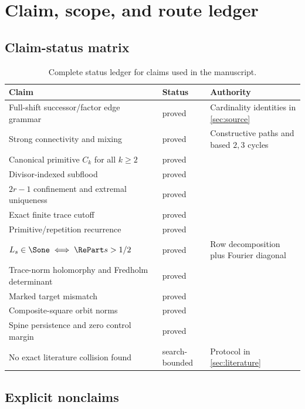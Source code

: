 \section{Claim, scope, and route ledger}
\label{app:ledger}

\subsection{Claim-status matrix}

\begin{table}[ht]
\centering
\small
\caption{Complete status ledger for claims used in the manuscript.}
\label{tab:claims}
\begin{tabularx}{\textwidth}{@{}L{0.31\textwidth}L{0.15\textwidth}Y@{}}
\toprule
Claim & Status & Authority\\
\midrule
Full-shift successor/factor edge grammar
 & proved & Cardinality identities in \cref{sec:source}\\
Strong connectivity and mixing
 & proved & Constructive paths and based \(2,3\) cycles\\
Canonical primitive \(C_k\) for all \(k\ge2\)
 & proved & \\
Divisor-indexed subflood
 & proved & \\
\(2r-1\) confinement and extremal uniqueness
 & proved & \\
Exact finite trace cutoff
 & proved & \\
Primitive/repetition recurrence
 & proved & \\
\(L_s\in\Sone\iff\RePart s>1/2\)
 & proved & Row decomposition plus Fourier diagonal\\
Trace-norm holomorphy and Fredholm determinant
 & proved & \\
Marked target mismatch
 & proved & \\
Composite-square orbit norms
 & proved & \\
Spine persistence and zero control margin
 & proved & \\
No exact literature collision found
 & search-bounded & Protocol in \cref{sec:literature}\\
\bottomrule
\end{tabularx}
\end{table}

\subsection{Explicit nonclaims}

